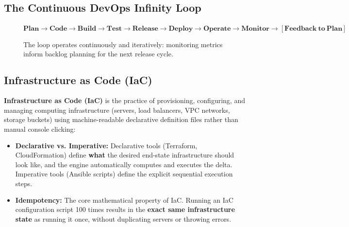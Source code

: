 \subsection{The Continuous DevOps Infinity Loop}
\begin{figure}[htbp]
\centering
\begin{tcolorbox}[colback=codebg, colframe=primary, title=\textbf{The Eight Stages of the Continuous DevOps Lifecycle}]
\begin{center}
$\mathbf{Plan \longrightarrow Code \longrightarrow Build \longrightarrow Test \longrightarrow Release \longrightarrow Deploy \longrightarrow Operate \longrightarrow Monitor \longrightarrow [Feedback\ to\ Plan]}$
\end{center}
The loop operates continuously and iteratively: monitoring metrics inform backlog planning for the next release cycle.
\end{tcolorbox}
\end{figure}

\subsection{Infrastructure as Code (IaC)}
\textbf{Infrastructure as Code (IaC)} is the practice of provisioning, configuring, and managing computing infrastructure (servers, load balancers, VPC networks, storage buckets) using machine-readable declarative definition files rather than manual console clicking:
\begin{itemize}
    \item \textbf{Declarative vs. Imperative:} Declarative tools (Terraform, CloudFormation) define \textbf{what} the desired end-state infrastructure should look like, and the engine automatically computes and executes the delta. Imperative tools (Ansible scripts) define the explicit sequential execution steps.
    \item \textbf{Idempotency:} The core mathematical property of IaC. Running an IaC configuration script 100 times results in the \textbf{exact same infrastructure state} as running it once, without duplicating servers or throwing errors.
\end{itemize}

